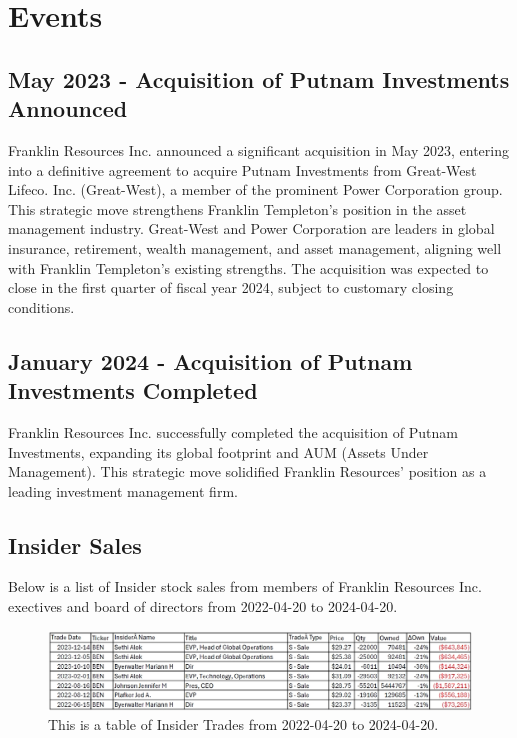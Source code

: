 \documentclass[9pt,a4paper,twoside]{tau}
\begin{document}
\section{Events}

    \subsection{May 2023 - Acquisition of Putnam Investments Announced}
	
        Franklin Resources Inc. announced a significant acquisition in May 2023, entering into a definitive agreement to acquire Putnam Investments from Great-West Lifeco. Inc. (Great-West), a member of the prominent Power Corporation group. This strategic move strengthens Franklin Templeton's position in the asset management industry. Great-West and Power Corporation are leaders in global insurance, retirement, wealth management, and asset management, aligning well with Franklin Templeton's existing strengths. The acquisition was expected to close in the first quarter of fiscal year 2024, subject to customary closing conditions.

    \subsection{January 2024 - Acquisition of Putnam Investments Completed}
	
        Franklin Resources Inc. successfully completed the acquisition of Putnam Investments, expanding its global footprint and AUM (Assets Under Management). This strategic move solidified Franklin Resources' position as a leading investment management firm.
    
    \subsection{Insider Sales}
        Below is a list of Insider stock sales from members of Franklin Resources Inc. exectives and board of directors from 2022-04-20 to 2024-04-20.
    
    
            \begin{figure}[H]
                \centering
                \includegraphics[width=0.95\columnwidth]{images/InsiderTrades.jpg}
                \caption{This is a table of Insider Trades from 2022-04-20 to 2024-04-20.}
                \label{fig:figure}
            \end{figure}
\end{document}
